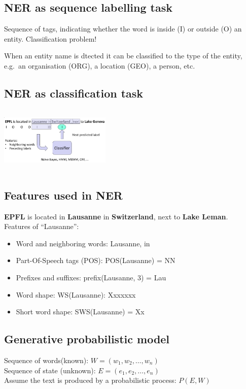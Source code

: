 \subsection{NER as sequence labelling task}
Sequence of tags, indicating whether the word is inside (I) or outside
(O) an entity. Classification problem!

When an entity name is dtected it can be classified to the type of the
entity, e.g.\ an organisation (ORG), a location (GEO), a person, etc.\

\subsection{NER as classification task}
\includegraphics[width=200px, height=120px]{ner}

\subsection{Features used in NER}
\textbf{EPFL} is located in \textbf{Lausanne} in \textbf{Switzerland},
next to \textbf{Lake Leman}. \\
Features of ``Lausanne'':
\begin{itemize}
\item Word and neighboring words: Lausanne, in
\item Part-Of-Speech tags (POS): POS(Lausanne) = NN
\item Prefixes and suffixes: prefix(Lausanne, 3) = Lau
\item Word shape: WS(Lausanne): Xxxxxxx
\item Short word shape: SWS(Lausanne) = Xx
\end{itemize}

\subsection{Generative probabilistic model}
Sequence of words(known): $ W = (w_1, w_2, \ldots, w_n) $ \\
Sequence of state (unknown): $ E = (e_1, e_2, \ldots, e_n) $ \\
Assume the text is produced by a probabilistic process: $ P(E, W) $

